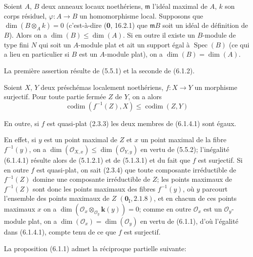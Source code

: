 \begin{corollary}[6.1.3]
Soient $A$, $B$ deux anneaux locaux noethériens, $\mathfrak m$ l'idéal maximal
de $A$, $k$ son corps résiduel, $\varphi:A\to B$ un homomorphisme local.
Supposons que $\dim(B\otimes_Ak)=0$ \textup{(c'est-à-dire (\textbf{0}, 16.2.1) que
$\mathfrak mB$ soit un} idéal de définition \textup{de $B$)}. Alors on a
$\dim(B)\leq\dim(A)$. Si en outre il existe un $B$-module de type fini $N$ qui
soit un $A$-module plat et ait un support égal à $\operatorname{Spec}(B)$
\textup{(ce qui a lieu en particulier si $B$ est un $A$-module} plat), on a
$\dim(B)=\dim(A)$.
\end{corollary}

La première assertion résulte de (5.5.1) et la seconde de (6.1.2).

\begin{corollary}[6.1.4]
\label{IV.2.s6.1.4-fr}
Soient $X$, $Y$ deux préschémas localement noethériens, $f:X\to Y$ un
morphisme surjectif. Pour toute partie fermée $Z$ de $Y$, on a alors
\begin{equation}
\operatorname{codim}(f^{-1}(Z),X)\leq\operatorname{codim}(Z,Y)
\tag{6.1.4.1}\label{IV.2.s6.1.4.1-fr}
\end{equation}

En outre, si $f$ est quasi-plat \textup{(2.3.3)} les deux membres de \textup{(6.1.4.1)} sont
égaux.
\end{corollary}

En effet, si $y$ est un point maximal de $Z$ et $x$ un point maximal de la
fibre $f^{-1}(y)$, on a
$\dim(\mathcal O_{X,x})\leq\dim(\mathcal O_{Y,y})$ en vertu de (5.5.2);
l'inégalité (6.1.4.1) résulte alors de (5.1.2.1) et de (5.1.3.1) et du fait
que $f$ est surjectif. Si en outre $f$ est quasi-plat, on sait (2.3.4) que
toute composante irréductible de $f^{-1}(Z)$ domine une composante
irréductible de $Z$; les points maximaux de $f^{-1}(Z)$ sont donc les points
maximaux des fibres $f^{-1}(y)$, où $y$ parcourt l'ensemble des points maximaux
de $Z$ $(\mathbf{0}_{\mathrm I}, 2.1.8)$, et en chacun de ces points maximaux $x$ on a
$\dim(\mathcal O_x\otimes_{\mathcal O_y}\boldsymbol{k}(y))=0$; comme en outre
$\mathcal O_x$ est un $\mathcal O_y$-module plat, on a
$\dim(\mathcal O_x)=\dim(\mathcal O_y)$ en vertu de (6.1.1), d'où l'égalité
dans (6.1.4.1), compte tenu de ce que $f$ est surjectif.

La proposition (6.1.1) admet la réciproque partielle suivante:

